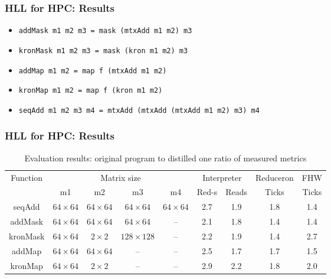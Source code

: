 \documentclass[xcolor=table,aspectratio=169]{beamer}
\begin{document}
\begin{frame}[fragile]
  \frametitle{HLL for HPC: Results} 
    \begin{itemize}
      \item \verb|addMask m1 m2 m3 = mask (mtxAdd m1 m2) m3|
      \item \verb|kronMask m1 m2 m3 = mask (kron m1 m2) m3 |   
      \item \verb|addMap m1 m2 = map f (mtxAdd m1 m2)|
      \item \verb|kronMap m1 m2 = map f (kron m1 m2)|
      \item \verb|seqAdd m1 m2 m3 m4 = mtxAdd (mtxAdd (mtxAdd m1 m2) m3) m4|              
    \end{itemize}
\end{frame}

\begin{frame}[fragile]
  \frametitle{HLL for HPC: Results}
  \begin{table}
    \centering    
    \begin{tabular}{|c|c|c|c|c||c|c|c|c|}
        \hline
        \multirow{2}{*}{Function} &  \multicolumn{4}{c||}{Matrix size}  & \multicolumn{2}{c|}{Interpreter}            & Reduceron & FHW\\
        \cline{2-9}
                                  &   m1 & m2 & m3 & m4                & Red-s & Reads                               & Ticks     & Ticks \\
        \hline
        seqAdd   & $64 \times 64$ & $64 \times 64$ & $64 \times 64$ & $64 \times 64$ & 2.7          & 1.9        & 1.8 & 1.4  \\ 
        addMask  & $64 \times 64$ & $64 \times 64$ & $64 \times 64$ & --             & 2.1          & 1.8        & 1.4 & 1.4  \\ 
        kronMask & $64 \times 64$ & $2 \times 2$   &$128 \times 128$& --             & 2.2          & 1.9        & 1.4 & 2.7  \\ 
        addMap   & $64 \times 64$ & $64 \times 64$ & --             & --             & 2.5          & 1.7        & 1.7 & 1.5  \\
        kronMap  & $64 \times 64$ & $2 \times 2$   & --             & --             & 2.9          & 2.2        & 1.8 & 2.0  \\ 
        \hline
        
    \end{tabular}
    \caption{Evaluation results: original program to distilled one ratio of measured metrics}
    \label{tbl:evaluationResults}
  \end{table} 
\end{frame}
\end{document}
